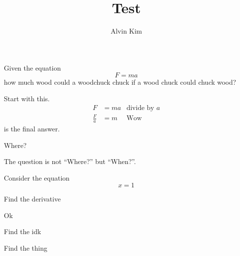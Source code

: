 \documentclass{article}
\title{Test}
\author{Alvin Kim}
\begin{document}
    \maketitle

    \tableofcontents

    \begin{problem}
        Given the equation
        \[F = ma\]
        how much wood could a woodchuck chuck if a wood chuck could chuck wood?
        \begin{solution}
            Start with this.
            \begin{align}
                F &= ma & \text{divide by \(a\)} \\
                \frac{F}{a} &= \boxed{m} & \text{Wow} 
            \end{align}
             is the final answer.
        \end{solution}
    \end{problem}

    \begin{problem}
        Where?
        \begin{solution}
            The question is not ``Where?'' but ``When?''.
        \end{solution}
    \end{problem}

    \begin{problem}
        Consider the equation
        \[x = 1\]

        \begin{subproblem}
            Find the derivative
            \begin{solution}
                Ok
            \end{solution}
        \end{subproblem}

        \begin{subproblem}
            Find the idk
        \end{subproblem}

        \begin{subproblem}
            Find the thing
        \end{subproblem}
    \end{problem}

    \begin{problem}
        \lipsum[1]

        \begin{solution}
            \lipsum[2]
        \end{solution}
    \end{problem}
\end{document}
